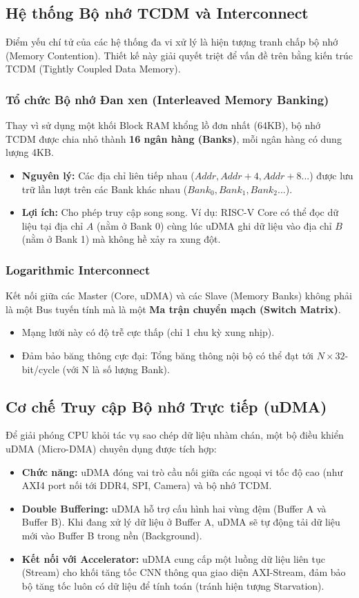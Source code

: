 \subsection{Hệ thống Bộ nhớ TCDM và Interconnect}
Điểm yếu chí tử của các hệ thống đa vi xử lý là hiện tượng tranh chấp bộ nhớ (Memory Contention). Thiết kế này giải quyết triệt để vấn đề trên bằng kiến trúc TCDM (Tightly Coupled Data Memory).

\subsubsection{Tổ chức Bộ nhớ Đan xen (Interleaved Memory Banking)}
Thay vì sử dụng một khối Block RAM khổng lồ đơn nhất (64KB), bộ nhớ TCDM được chia nhỏ thành \textbf{16 ngân hàng (Banks)}, mỗi ngân hàng có dung lượng 4KB.
\begin{itemize}
    \item \textbf{Nguyên lý:} Các địa chỉ liên tiếp nhau ($Addr, Addr+4, Addr+8...$) được lưu trữ lần lượt trên các Bank khác nhau ($Bank_0, Bank_1, Bank_2...$).
    \item \textbf{Lợi ích:} Cho phép truy cập song song. Ví dụ: RISC-V Core có thể đọc dữ liệu tại địa chỉ $A$ (nằm ở Bank 0) cùng lúc uDMA ghi dữ liệu vào địa chỉ $B$ (nằm ở Bank 1) mà không hề xảy ra xung đột.
\end{itemize}

\subsubsection{Logarithmic Interconnect}
Kết nối giữa các Master (Core, uDMA) và các Slave (Memory Banks) không phải là một Bus tuyến tính mà là một \textbf{Ma trận chuyển mạch (Switch Matrix)}.
\begin{itemize}
    \item Mạng lưới này có độ trễ cực thấp (chỉ 1 chu kỳ xung nhịp).
    \item Đảm bảo băng thông cực đại: Tổng băng thông nội bộ có thể đạt tới $N \times 32$-bit/cycle (với N là số lượng Bank).
\end{itemize}

\subsection{Cơ chế Truy cập Bộ nhớ Trực tiếp (uDMA)}
Để giải phóng CPU khỏi tác vụ sao chép dữ liệu nhàm chán, một bộ điều khiển uDMA (Micro-DMA) chuyên dụng được tích hợp:
\begin{itemize}
    \item \textbf{Chức năng:} uDMA đóng vai trò cầu nối giữa các ngoại vi tốc độ cao (như AXI4 port nối tới DDR4, SPI, Camera) và bộ nhớ TCDM.
    \item \textbf{Double Buffering:} uDMA hỗ trợ cấu hình hai vùng đệm (Buffer A và Buffer B). Khi đang xử lý dữ liệu ở Buffer A, uDMA sẽ tự động tải dữ liệu mới vào Buffer B trong nền (Background).
    \item \textbf{Kết nối với Accelerator:} uDMA cung cấp một luồng dữ liệu liên tục (Stream) cho khối tăng tốc CNN thông qua giao diện AXI-Stream, đảm bảo bộ tăng tốc luôn có dữ liệu để tính toán (tránh hiện tượng Starvation).
\end{itemize}

